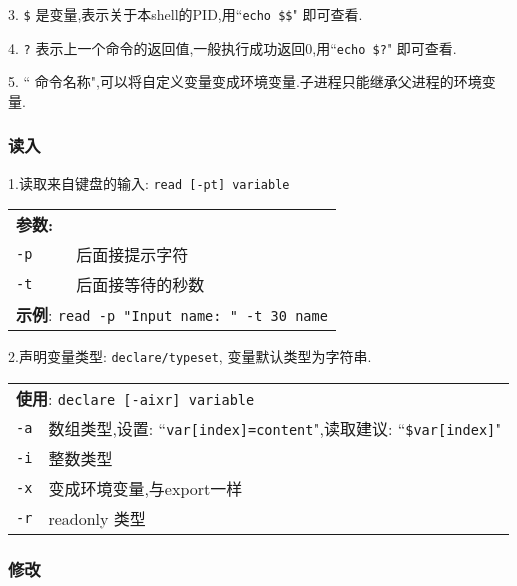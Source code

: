 \par
3. \texttt{\$} 是变量,表示关于本shell的PID,用``\verb|echo $$|" 即可查看.

\par
4. \texttt{?} 表示上一个命令的返回值,一般执行成功返回0,用``\verb|echo $?|" 即可查看.

\par
5. `` 命令名称",可以将自定义变量变成环境变量.子进程只能继承父进程的环境变量.

\subsubsection{读入}
\par
1.读取来自键盘的输入: \texttt{read [-pt] variable}
\begin{longtable}{l@{: }p{}}\hline\hline
\multicolumn{2}{l}{\bfseries 参数:}\\

  \texttt{-p} & 后面接提示字符 \\

  \texttt{-t} & 后面接等待的秒数 \\

  \multicolumn{2}{l}{ \textbf{示例}: \texttt{read -p "Input name: " -t 30 name}}\\
  \hline
\end{longtable}

\par
2.声明变量类型: \texttt{declare/typeset}, 变量默认类型为字符串.
\begin{longtable}{l@{: }p{}}\hline\hline
\multicolumn{2}{l}{  \textbf{使用}: \texttt{declare [-aixr] variable} }\\

  \texttt{-a} & 数组类型,设置: ``\texttt{var[index]=content}",读取建议: ``\texttt{\${var[index]}}" \\

  \texttt{-i} & 整数类型 \\

  \texttt{-x} & 变成环境变量,与export一样 \\

  \texttt{-r} & readonly 类型 \\
  \hline
\end{longtable}

\subsubsection{修改}

